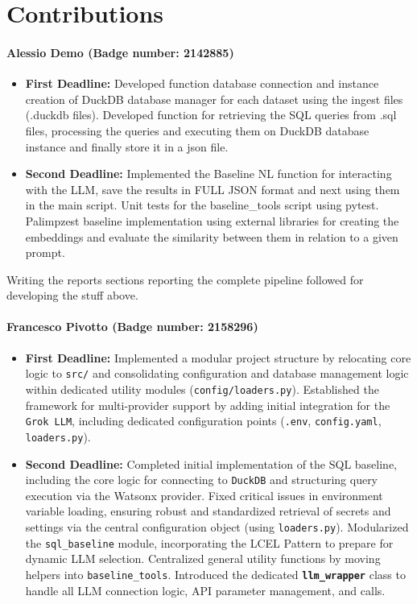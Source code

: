 \section{Contributions}

\paragraph{\textbf{Alessio Demo (Badge number: 2142885)}}
\begin{itemize}[leftmargin=*]
    \item \textbf{First Deadline:}  Developed function database connection and instance creation of DuckDB database manager for each dataset using the ingest files (.duckdb files).
    Developed function for retrieving the SQL queries from .sql files, processing the queries and executing them on DuckDB database instance and finally store it in a json file. 
    \item \textbf{Second Deadline:} Implemented the Baseline NL function for interacting with the LLM, save the results in FULL JSON format and next using them in the main script. Unit tests for the baseline\_tools script using pytest. Palimpzest baseline implementation using external libraries for creating the embeddings and evaluate the similarity between them in relation to a given prompt.
\end{itemize}
Writing the reports sections reporting the complete pipeline followed for developing the stuff above.

\paragraph{\textbf{Francesco Pivotto (Badge number: 2158296)}}
\begin{itemize}[leftmargin=*]
    \item \textbf{First Deadline:} Implemented a modular project structure by relocating core logic to \texttt{src/} and consolidating configuration and database management logic within dedicated utility modules (\texttt{config/loaders.py}). 
    Established the framework for multi-provider support by adding initial integration for the \texttt{Grok LLM}, including dedicated configuration points (\texttt{.env}, \texttt{config.yaml}, \texttt{loaders.py}).
    
    \item \textbf{Second Deadline:} Completed initial implementation of the SQL baseline, including the core logic for connecting to \texttt{DuckDB} and structuring query execution via the Watsonx provider.
    Fixed critical issues in environment variable loading, ensuring robust and standardized retrieval of secrets and settings via the central configuration object (using \texttt{loaders.py}).
    Modularized the \texttt{sql\_baseline} module, incorporating the LCEL Pattern to prepare for dynamic LLM selection.
    Centralized general utility functions by moving helpers into \texttt{baseline\_tools}.
    Introduced the dedicated \textbf{\texttt{llm\_wrapper}} class to handle all LLM connection logic, API parameter management, and calls.
\end{itemize}


